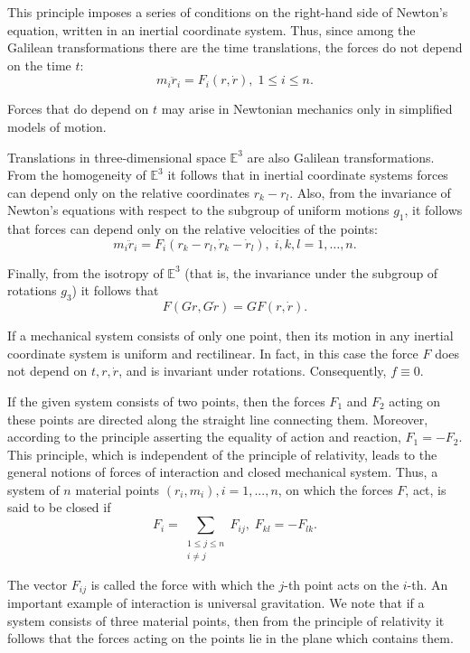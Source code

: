 \documentclass[a4paper]{article}
\begin{document}
This principle imposes a series of conditions on the right-hand side of Newton's equation, written in an inertial coordinate
system. Thus, since among the Galilean transformations there are the time translations, the forces do not depend on the time $t$:
$$m_i\ddot r_i = F_i(r, \dot r), \; 1 \leqslant i \leqslant n.$$

Forces that do depend on $t$ may arise in Newtonian mechanics only in simplified models of motion.

Translations in three-dimensional space $\mathbb{E}^3$ are also Galilean transformations. From the homogeneity of $\mathbb{E}^3$
it follows that in inertial coordinate systems forces can depend only on the relative coordinates $r_k-r_l$. Also, from the
invariance of Newton's equations with respect to the subgroup of uniform motions $g_1$, it follows that forces can depend
only on the relative velocities of the points:
$$m_i \ddot r_i = F_i(r_k-r_l, \dot r_k - \dot r_l), \; i,k,l=1,\ldots,n.$$

Finally, from the isotropy of $\mathbb{E}^3$ (that is, the invariance under the subgroup of rotations $g_3$) it follows that
$$F(Gr,G \dot r)= GF(r,\dot r).$$

If a mechanical system consists of only one point, then its motion in any inertial coordinate system is uniform and rectilinear.
In fact, in this case the force $F$ does not depend on $t, r, \dot r$, and is invariant under rotations. Consequently, $f \equiv 0$.

If the given system consists of two points, then the forces $F_1$ and $F_2$ acting on these points are directed along the
straight line connecting them. Moreover, according to the principle asserting the equality of action and reaction, $F_1 = -F_2$.
This principle, which is independent of the principle of relativity, leads to the general notions of forces of interaction and
closed mechanical system. Thus, a system of $n$ material points $(r_i, m_i), i = 1,...,n$, on which the forces $F$, act, is
said to be closed if
$$F_i = \sum_{
\begin{smallmatrix}
1 \leqslant j \leqslant n \\
i \neq j \end{smallmatrix}}
F_{ij}, \; F_{kl} = -F_{lk}.$$

The vector $F_{ij}$ is called the force with which the $j$-th point acts on the $i$-th. An important example of interaction is
universal gravitation. We note that if a system consists of three material points, then from the principle of relativity it
follows that the forces acting on the points lie in the plane which contains them.
\end{document}
